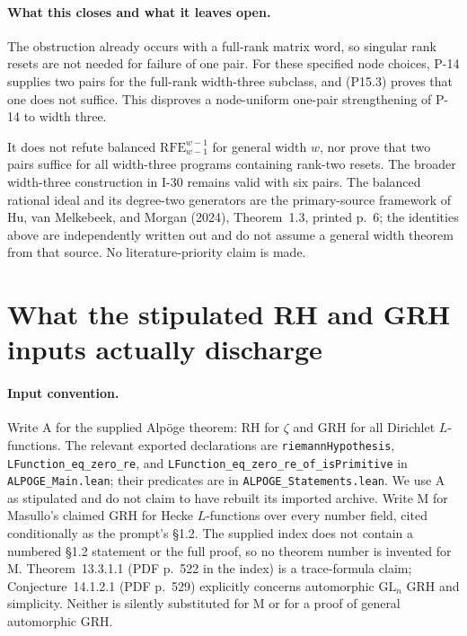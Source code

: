 \documentclass[11pt,a4paper]{article}
\theoremstyle{definition}\newtheorem{definition}{Definition}
\begin{document}
\paragraph{What this closes and what it leaves open.}
The obstruction already occurs with a full-rank matrix word,
so singular rank resets are not needed for failure of one pair.
For these specified node choices, P-14 supplies two pairs for
the full-rank width-three subclass, and (P15.3) proves that one
does not suffice. This disproves a node-uniform one-pair
strengthening of P-14 to width three.

It does not refute balanced $\mathrm{RFE}_{w-1}^{w-1}$ for
general width $w$, nor prove that two pairs suffice for all
width-three programs containing rank-two resets. The broader
width-three construction in I-30 remains valid with six pairs.
The balanced rational ideal and its degree-two generators are
the primary-source framework of Hu, van Melkebeek, and Morgan
(2024), Theorem~1.3, printed p.~6; the identities above are
independently written out and do not assume a general width
theorem from that source. No literature-priority claim is made.



\section{What the stipulated RH and GRH inputs actually discharge}

\paragraph{Input convention.}
Write A for the supplied Alp\"oge theorem: RH for $\zeta$ and GRH for all Dirichlet $L$-functions. The relevant exported declarations are \nolinkurl{riemannHypothesis}, \nolinkurl{LFunction_eq_zero_re}, and \nolinkurl{LFunction_eq_zero_re_of_isPrimitive} in \nolinkurl{ALPOGE_Main.lean}; their predicates are in \nolinkurl{ALPOGE_Statements.lean}. We use A as stipulated and do not claim to have rebuilt its imported archive. Write M for Masullo's claimed GRH for Hecke $L$-functions over every number field, cited conditionally as the prompt's \S1.2. The supplied index does not contain a numbered \S1.2 statement or the full proof, so no theorem number is invented for M. Theorem~13.3.1.1 (PDF p.~522 in the index) is a trace-formula claim; Conjecture~14.1.2.1 (PDF p.~529) explicitly concerns automorphic $\mathrm{GL}_n$ GRH and simplicity. Neither is silently substituted for M or for a proof of general automorphic GRH.
\end{document}
